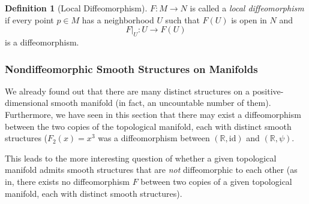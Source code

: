 \documentclass{article}
\theoremstyle{remark}
\theoremstyle{definition}
\newtheorem{definition}{Definition}[section]
\begin{document}
\begin{definition}[Local Diffeomorphism]
$F: M \longrightarrow N$ is called a \textit{local diffeomorphism} if every point $p \in M$ has a neighborhood $U$ such that $F(U)$ is open in $N$ and 
\[F \big|_U : U \longrightarrow F(U)\]
is a diffeomorphism. 
\end{definition}

\subsubsection{Nondiffeomorphic Smooth Structures on Manifolds}
We already found out that there are many distinct structures on a positive-dimensional smooth manifold (in fact, an uncountable number of them). Furthermore, we have seen in this section that there may exist a diffeomorphism between the two copies of the topological manifold, each with distinct smooth structures ($F_2 (x) = x^3$ was a diffeomorphism between $(\mathbb{R}, \text{id})$ and $(\mathbb{R}, \psi)$. 

This leads to the more interesting question of whether a given topological manifold admits smooth structures that are \textit{not} diffeomorphic to each other (as in, there exists no diffeomorphism $F$ between two copies of a given topological manifold, each with distinct smooth structures). 
\end{document}
